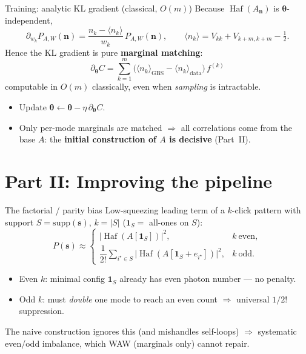 \documentclass[10pt,aspectratio=169]{beamer}
\newcommand{\Haf}{\operatorname{Haf}}
\newcommand{\vs}{\mathbf{s}}
\newcommand{\vn}{\mathbf{n}}
\begin{document}
\begin{frame}{Training: analytic KL gradient (classical, $O(m)$)}
Because $\Haf(A_{\vn})$ is $\bm\theta$-independent,
\[
\partial_{w_k}P_{A,W}(\vn)=\frac{n_k-\langle n_k\rangle}{w_k}\,P_{A,W}(\vn),\qquad
\langle n_k\rangle=V_{kk}+V_{k+m,k+m}-\tfrac12 .
\]
Hence the KL gradient is pure \textbf{marginal matching}:
\[
\boxed{\;\partial_{\bm\theta}C
=\sum_{k=1}^m\big(\langle n_k\rangle_{\mathrm{GBS}}-\langle n_k\rangle_{\mathrm{data}}\big)\,f^{(k)}\;}
\]
computable in $O(m)$ classically, even when \emph{sampling} is intractable.
\begin{itemize}
  \item Update $\bm\theta\leftarrow\bm\theta-\eta\,\partial_{\bm\theta}C$.
  \item \alert{Only per-mode marginals are matched} $\Rightarrow$ all
        correlations come from the base $A$: the \textbf{initial construction of
        $A$ is decisive} (Part~II).
\end{itemize}
\end{frame}

\section{Part II: Improving the pipeline}

\begin{frame}{The factorial / parity bias}
Low-squeezing leading term of a $k$-click pattern with support
$S=\mathrm{supp}(\vs)$, $k=|S|$ ($\mathbf 1_S=$ all-ones on $S$):
\[
P(\vs)\approx
\begin{cases}
\big|\Haf(A[\mathbf 1_S])\big|^2, & k\ \text{even},\\[4pt]
\dfrac{1}{2!}\displaystyle\sum_{i^\star\in S}\big|\Haf(A[\mathbf 1_S+e_{i^\star}])\big|^2, & k\ \text{odd}.
\end{cases}
\]
\begin{itemize}
  \item Even $k$: minimal config $\mathbf 1_S$ already has even photon number — no penalty.
  \item Odd $k$: must \emph{double} one mode to reach an even count $\Rightarrow$
        universal $1/2!$ suppression.
\end{itemize}
The naive construction ignores this (and mishandles self-loops) $\Rightarrow$
systematic even/odd imbalance, which WAW (marginals only) cannot repair.
\end{frame}
\end{document}
